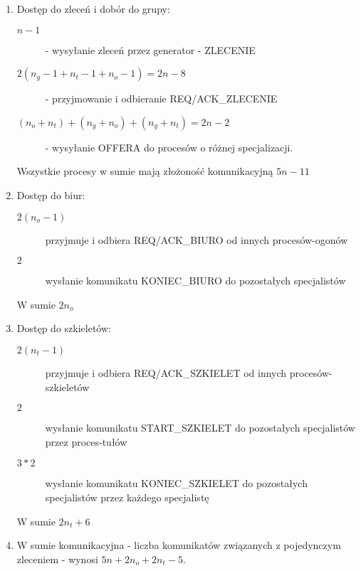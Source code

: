 \documentclass[12pt]{article}
\begin{document}
\begin{enumerate}
	\item Dostęp do zleceń i dobór do grupy:
	\begin{description}
		\item[\(n-1\)] - wysyłanie zleceń przez generator - ZLECENIE
		\item[\(2(n_g-1+n_t-1+n_o-1)=2n-8\)] - przyjmowanie  i odbieranie REQ/ACK\_ZLECENIE
		\item[\((n_o+n_t)+(n_g+n_o)+(n_g+n_t)=2n-2\)] - wysyłanie OFFERA do procesów o różnej specjalizacji.
	\end{description} 
	Wszystkie procesy w sumie mają złożoność komunikacyjną \(5n-11\)
	
	
	\item Dostęp do biur:
	\begin{description}
		\item[\(2(n_o-1)\)] przyjmuje i odbiera REQ/ACK\_BIURO od innych procesów-ogonów
		\item[\(2\)] wysłanie komunikatu KONIEC\_BIURO do pozostałych specjalistów
	\end{description} 
	W sumie \(2n_o\)
	\item Dostęp do szkieletów:
	\begin{description}
		\item[\(2(n_t-1)\)] przyjmuje i odbiera REQ/ACK\_SZKIELET od innych procesów-szkieletów
		\item[\(2\)] wysłanie komunikatu START\_SZKIELET do pozostałych specjalistów przez proces-tułów
		\item[\(3*2\)] wysłanie komunikatu KONIEC\_SZKIELET do pozostałych specjalistów przez każdego specjalistę
	\end{description}
	W sumie \(2n_t+6\)
	\item W sumie komunikacyjna - liczba komunikatów związanych z pojedynczym zleceniem - wynosi \(5n+2n_o+2n_t-5\).
\end{enumerate}
\end{document}
